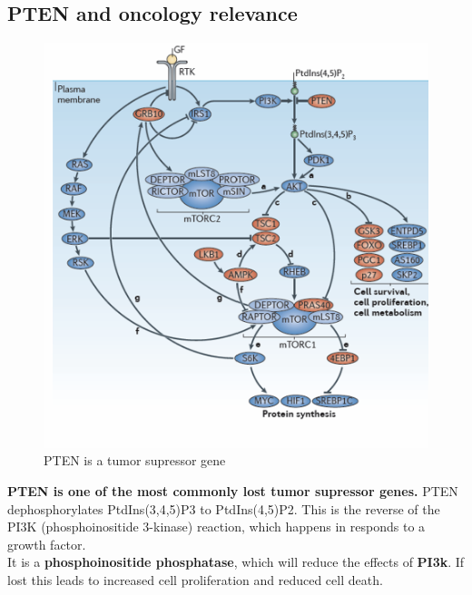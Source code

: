 \documentclass[../main.tex]{subfiles}
\begin{document}
\subsection{PTEN and oncology relevance}
\begin{figure}[H]
    \centering
    \includegraphics[width=0.5\linewidth]{PTEN.png}
    \caption{PTEN is a tumor supressor gene}
    \label{fig:enter-label}
\end{figure}
\textbf{PTEN is one of the most commonly lost tumor supressor genes.} PTEN dephosphorylates PtdIns(3,4,5)P3 to PtdIns(4,5)P2. This is the reverse of the PI3K (phosphoinositide 3-kinase) reaction, which happens in responds to a growth factor.\\
\indent It is a \textbf{phosphoinositide phosphatase}, which will reduce the effects of \textbf{PI3k}. If lost this leads to increased cell proliferation and reduced cell death.
\end{document}

